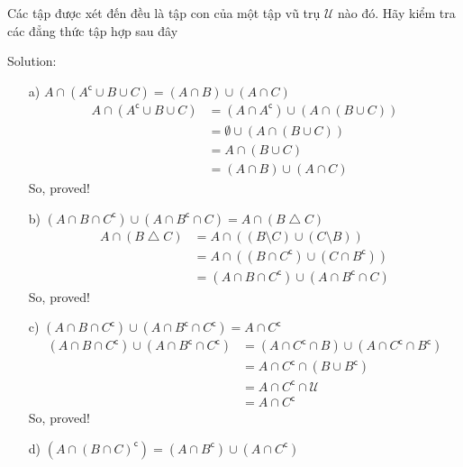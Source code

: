 
\begin{longfbox}
      \begin{bt} \label{pro:practice1.5}
            Các tập được xét đến đều là tập con của một tập vũ trụ $\mathcal U$ nào đó. Hãy kiểm tra các đẳng thức tập hợp sau đây
      \end{bt}
\end{longfbox}

Solution:
\begin{enumerate}
\item[a)] $A\cap (A^\mathsf{c}\cup B\cup C) = (A\cap B)\cup(A\cap C)$ \\
      \begin{align}
            A\cap (A^\mathsf{c}\cup B\cup C)
            &= (A\cap A^\mathsf{c})\cup (A\cap(B\cup C)) \\
            &= \emptyset\cup(A\cap(B\cup C)) \\
            &= A\cap(B\cup C) \\
            &= (A\cap B)\cup(A\cap C)
      \end{align} 
      So, proved!
\item[b)] $(A\cap B\cap C^\mathsf{c})\cup(A\cap B^\mathsf{c}\cap C) = A\cap (B\bigtriangleup C)$ \\
      \begin{align}
            A\cap (B\bigtriangleup C)
            &= A\cap((B\setminus C)\cup(C\setminus B)) \\
            &= A\cap((B\cap C^\mathsf{c})\cup(C\cap B^\mathsf{c})) \\
            &= (A\cap B\cap C^\mathsf{c})\cup(A\cap B^\mathsf{c}\cap C)
      \end{align} 
      So, proved!
\item[c)] $(A\cap B\cap C^\mathsf{c})\cup(A\cap B^\mathsf{c}\cap C^\mathsf{c}) = A\cap C^\mathsf{c}$ \\
      \begin{align}
            (A\cap B\cap C^\mathsf{c})\cup(A\cap B^\mathsf{c}\cap C^\mathsf{c})
            &= (A\cap C^\mathsf{c}\cap B)\cup(A\cap C^\mathsf{c}\cap B^\mathsf{c}) \\
            &= A\cap C^\mathsf{c}\cap(B\cup B^\mathsf{c}) \\
            &= A\cap C^\mathsf{c}\cap\mathcal U \\
            &= A\cap C^\mathsf{c}
      \end{align} 
      So, proved!
\item[d)] $(A\cap(B\cap C)^\mathsf{c}) = (A\cap B^\mathsf{c})\cup(A\cap C^\mathsf{c})$ \\

\end{enumerate}
